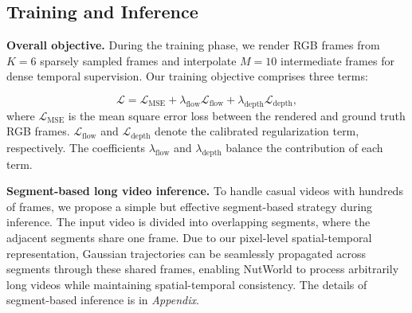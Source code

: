 





\subsection{Training and Inference}
\label{train}
\noindent\textbf{Overall objective.} During the training phase, we render RGB frames from $K = 6$ sparsely sampled frames and interpolate $M = 10$ intermediate frames for dense temporal supervision. Our training objective comprises three terms:

\begin{equation}
\mathcal{L} = \mathcal{L}_{\text{MSE}} + \lambda_{\text{flow}}\mathcal{L}_{\text{flow}} + \lambda_{\text{depth}}\mathcal{L}_{\text{depth}},
\end{equation}
where $\mathcal{L}_{\text{MSE}}$ is the mean square error loss between the rendered and ground truth RGB frames. $\mathcal{L}_{\text{flow}}$ and $\mathcal{L}_{\text{depth}}$ denote the calibrated regularization term, respectively. The coefficients $\lambda_{\text{flow}}$ and $\lambda_{\text{depth}}$ balance the contribution of each term.


\noindent\textbf{Segment-based long video inference.} To handle casual videos with hundreds of frames, we propose a simple but effective segment-based strategy during inference. The input video is divided into overlapping segments, where the adjacent segments share one frame. Due to our pixel-level spatial-temporal representation, Gaussian trajectories can be seamlessly propagated across segments through these shared frames, enabling NutWorld to process arbitrarily long videos while maintaining spatial-temporal consistency. The details of segment-based inference is in \textit{Appendix}.






